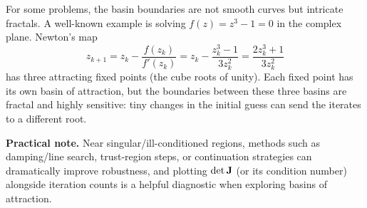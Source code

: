 \begin{exampleBox}
\begin{center}
    \end{center}
\end{exampleBox}

For some problems, the basin boundaries are not smooth curves but intricate fractals. A well-known example is solving \(f(z)=z^3-1=0\) in the complex plane. Newton's map
\[
z_{k+1}=z_k-\frac{f(z_k)}{f'(z_k)}=z_k-\frac{z_k^3-1}{3z_k^2}=\frac{2z_k^3+1}{3z_k^2}
\]
has three attracting fixed points (the cube roots of unity). Each fixed point has its own basin of attraction, but the boundaries between these three basins are fractal and highly sensitive: tiny changes in the initial guess can send the iterates to a different root.


\textbf{Practical note.} Near singular/ill-conditioned regions, methods such as damping/line search, trust-region steps, or continuation strategies can dramatically improve robustness, and plotting \(\det\mathbf{J}\) (or its condition number) alongside iteration counts is a helpful diagnostic when exploring basins of attraction.

